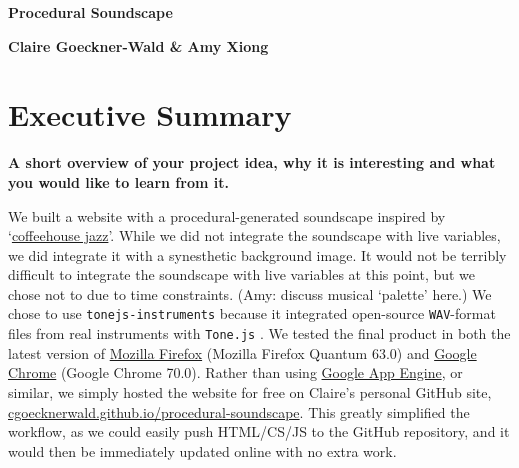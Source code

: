 \documentclass[12pt,a4paper]{article}
\newcommand{\code}{\texttt}
\newcommand{\lightcode}[1]{\colorbox{light-gray}{\texttt{#1}}}
\begin{document}
\pagestyle{plain}


\begin{center}
{\LARGE{\bf
{{Procedural Soundscape}}
}}
\end{center}
\bigskip

\centerline{\bf{Claire Goeckner-Wald \& Amy Xiong}}

\bigskip

\tableofcontents

\pagebreak
\section{Executive Summary}

\textbf{A short overview of your project idea, why it is interesting and what you would like to learn from it.}

We built a website with a procedural-generated soundscape inspired by `\href{https://www.youtube.com/watch?v=K2Q6YO3Ez44}{coffeehouse jazz}'. While we did not integrate the soundscape with live variables, we did integrate it with a synesthetic background image. It would not be terribly difficult to integrate the soundscape with live variables at this point, but we chose not to due to time constraints. (Amy: discuss musical `palette' here.) We chose to use \lightcode{tonejs-instruments} because it integrated open-source \code{WAV}-format files from real instruments with \lightcode{Tone.js} \cite{tonejs-instruments}. We tested the final product in both the latest version of \href{https://www.mozilla.org/en-US/firefox/}{Mozilla Firefox} (Mozilla Firefox Quantum 63.0) and \href{https://www.google.com/chrome/index.html}{Google Chrome} (Google Chrome 70.0). Rather than using \href{https://cloud.google.com/appengine/}{Google App Engine}, or similar, we simply hosted the website for free on Claire's personal GitHub site, \href{https://cgoecknerwald.github.io/procedural-soundscape}{cgoecknerwald.github.io/procedural-soundscape}. This greatly simplified the workflow, as we could easily push HTML/CS/JS to the GitHub repository, and it would then be immediately updated online with no extra work.
\end{document}
